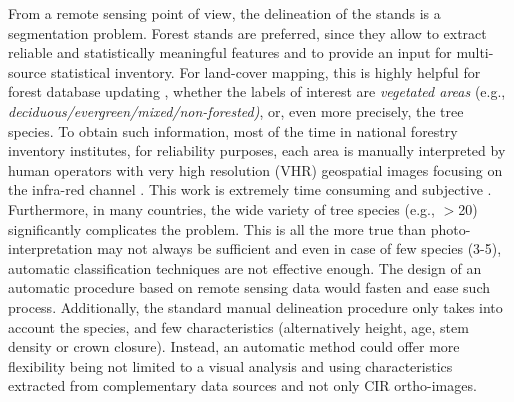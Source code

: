 From a remote sensing point of view, the delineation of the stands is a segmentation problem. Forest stands are preferred, since they allow to extract reliable and statistically meaningful features and to provide an input for multi-source statistical inventory. For land-cover mapping, this is highly helpful for forest database updating \citep{Kim09}, whether the labels of interest are \textit{vegetated areas} {(e.g., \textit{deciduous/evergreen/mixed/non-forested)}}, or, even more precisely, the tree species. To obtain such information, most of the time in national forestry inventory institutes, for reliability purposes, each area is manually interpreted by human operators with very high resolution (VHR) geospatial images focusing on the infra-red channel \citep{Malatamo}. This work is extremely time consuming and subjective \citep{Wulder2008}. Furthermore, in many countries, the wide variety of tree species (e.g., $>$20) significantly complicates the problem. This is all the more true than photo-interpretation may not always be sufficient and even in case of few species (3-5), automatic classification techniques are not effective enough. The design of an automatic procedure based on remote sensing data would fasten and ease such process. Additionally, the standard manual delineation procedure only takes into account the species, and few characteristics (alternatively height, age, stem density or crown closure). Instead, an automatic method could offer more flexibility being not limited to a visual analysis and using characteristics extracted from complementary data sources and not only CIR ortho-images. \\

